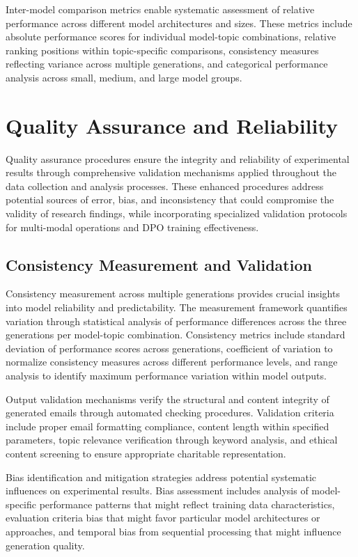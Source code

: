 Inter-model comparison metrics enable systematic assessment of relative performance across different model architectures and sizes. These metrics include absolute performance scores for individual model-topic combinations, relative ranking positions within topic-specific comparisons, consistency measures reflecting variance across multiple generations, and categorical performance analysis across small, medium, and large model groups.

\section{Quality Assurance and Reliability}
\label{sec:quality-assurance}

Quality assurance procedures ensure the integrity and reliability of experimental results through comprehensive validation mechanisms applied throughout the data collection and analysis processes. These enhanced procedures address potential sources of error, bias, and inconsistency that could compromise the validity of research findings, while incorporating specialized validation protocols for multi-modal operations and DPO training effectiveness.

\subsection{Consistency Measurement and Validation}

Consistency measurement across multiple generations provides crucial insights into model reliability and predictability. The measurement framework quantifies variation through statistical analysis of performance differences across the three generations per model-topic combination. Consistency metrics include standard deviation of performance scores across generations, coefficient of variation to normalize consistency measures across different performance levels, and range analysis to identify maximum performance variation within model outputs.

Output validation mechanisms verify the structural and content integrity of generated emails through automated checking procedures. Validation criteria include proper email formatting compliance, content length within specified parameters, topic relevance verification through keyword analysis, and ethical content screening to ensure appropriate charitable representation.

Bias identification and mitigation strategies address potential systematic influences on experimental results. Bias assessment includes analysis of model-specific performance patterns that might reflect training data characteristics, evaluation criteria bias that might favor particular model architectures or approaches, and temporal bias from sequential processing that might influence generation quality.

